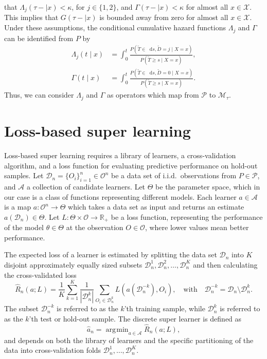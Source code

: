\documentclass[lineno]{biometrika}
\newcommand{\R}{\mathbb{R}}
\newcommand*\diff{\mathop{}\!\mathrm{d}}
\newcommand{\1}{\mathds{1}}
\DeclareMathOperator*{\argmin}{\arg\!\min}
\newcommand{\data}{\ensuremath{\mathcal{D}}}
\begin{document}
that \(\Lambda_{j}(\tau- \mid x)<\kappa \), for \(j\in\{1,2\}\), and
\(\Gamma(\tau- \mid x)<\kappa\) for almost all \(x\in\mathcal
X\). This implies that \(G(\tau- \mid x)\) is bounded away
from zero for almost all \(x\in\mathcal X\).  Under these assumptions,
the conditional cumulative hazard functions \(\Lambda_{j}\) and
\(\Gamma\) can be identified from \(P\) by
\begin{align}
  \Lambda_{j}(t \mid x) &= \int_0^t\frac{  P(\tilde T \in \diff s, \tilde D=j \mid X=x )}{P(\tilde T \geq s \mid X=x )}, \label{eq:lambdaj}\\
  \Gamma(t \mid x) &= \int_0^t\frac{  P(\tilde T \in \diff s, \tilde D=0 \mid X=x )}{P(\tilde T \geq s \mid X=x )}\label{eq:gamma}.
\end{align}
Thus, we can consider $\Lambda_j$ and \(\Gamma\) as operators which map from
\( \mathcal{P} \) to \(\mathcal M_{\tau}\).

\section{Loss-based super learning}
\label{sec:super-learning}

Loss-based super learning requires a library of learners, a
cross-validation algorithm, and a loss function for evaluating
predictive performance on hold-out samples. Let \(
\data_n=\{O_i\}_{i=1}^n \in \mathcal{O}^n \) be a data set of i.i.d.\
observations from \( P \in \mathcal{P} \), and $\mathcal{A}$ a
collection of candidate learners. Let \(\Theta\) be the parameter
space, which in our case is a class of functions representing
different models. Each learner \(a \in \mathcal{A}\) is a map \( a
\colon \mathcal{O}^n \rightarrow \Theta \) which takes a data set as
input and returns an estimate $a(\data_n) \in \Theta$. Let \(L\colon
\Theta \times \mathcal{O} \rightarrow \R_+\) be a loss function,
representing the performance of the model $\theta \in \Theta$ at the
observation \( O \in \mathcal{O} \), where lower values mean better
performance.

The expected loss of a learner is estimated by splitting the data set
$\data_n$ into $K$ disjoint approximately equally sized subsets
\(\data_n^1, \data_n^2, \dots, \data_n^K \) and then calculating the
cross-validated loss
\begin{equation}
  \label{eq:cv-risk-est}
  \hat{R}_n(a; L) =
  \frac{1}{K}\sum_{k=1}^{K}
  \frac{1}{| \data_n^{k} |}\sum_{O_i \in \data_n^{k}}
  L
  {
    \left(
      a{ (\data_n^{-k})}
      , O_i
    \right)
  },
  \quad \text{with} \quad
  \data_n^{-k} = \data_n \setminus \data_n^{k}.
\end{equation}
The subset \(\data_n^{-k}\) is referred to as the \(k\)'th training
sample, while \(\data_n^{k}\) is referred to as the \(k\)'th test or
hold-out sample.
The discrete super learner is defined as
\begin{equation*}
\hat{a}_n = \argmin_{a\in\mathcal A}\hat{R}_n(a; L),
\end{equation*}
and depends on both the library of learners and the specific
partitioning of the data into cross-validation folds
\( \data_n^1, \dots, \data_n^K \).
\end{document}
